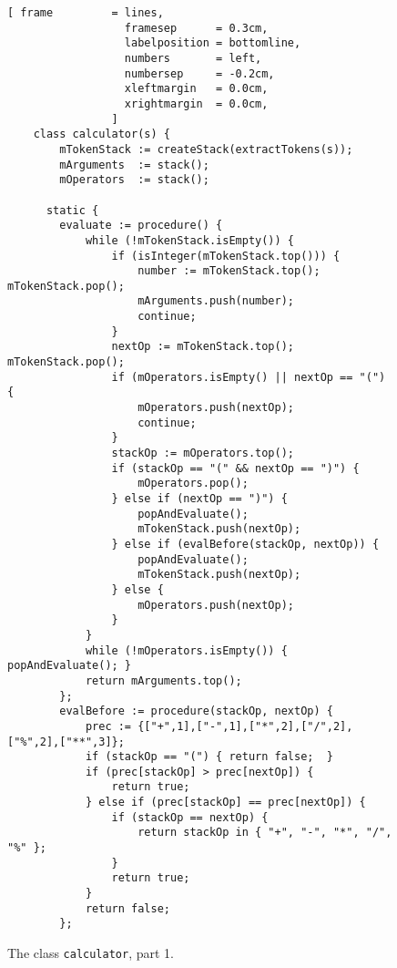 \begin{figure}[!b]
  \centering
\begin{Verbatim}[ frame         = lines, 
                  framesep      = 0.3cm, 
                  labelposition = bottomline,
                  numbers       = left,
                  numbersep     = -0.2cm,
                  xleftmargin   = 0.0cm,
                  xrightmargin  = 0.0cm,
                ]
    class calculator(s) {
        mTokenStack := createStack(extractTokens(s));
        mArguments  := stack();
        mOperators  := stack();
    
      static {
        evaluate := procedure() {
            while (!mTokenStack.isEmpty()) {
                if (isInteger(mTokenStack.top())) {
                    number := mTokenStack.top(); mTokenStack.pop();
                    mArguments.push(number);
                    continue;
                } 
                nextOp := mTokenStack.top(); mTokenStack.pop();
                if (mOperators.isEmpty() || nextOp == "(") {
                    mOperators.push(nextOp);
                    continue;
                }
                stackOp := mOperators.top();
                if (stackOp == "(" && nextOp == ")") {
                    mOperators.pop();
                } else if (nextOp == ")") {
                    popAndEvaluate();
                    mTokenStack.push(nextOp);
                } else if (evalBefore(stackOp, nextOp)) {
                    popAndEvaluate();
                    mTokenStack.push(nextOp);
                } else {
                    mOperators.push(nextOp);
                }
            }
            while (!mOperators.isEmpty()) { popAndEvaluate(); }
            return mArguments.top();
        };
        evalBefore := procedure(stackOp, nextOp) {
            prec := {["+",1],["-",1],["*",2],["/",2],["%",2],["**",3]};
            if (stackOp == "(") { return false;  }
            if (prec[stackOp] > prec[nextOp]) {
                return true;
            } else if (prec[stackOp] == prec[nextOp]) {
                if (stackOp == nextOp) {
                    return stackOp in { "+", "-", "*", "/", "%" };
                }
                return true;
            } 
            return false;
        };
\end{Verbatim}
\vspace*{-0.3cm}
  \caption{The class \texttt{calculator}, part 1.}
  \label{fig:calculator.setlx-1}
\end{figure} 

